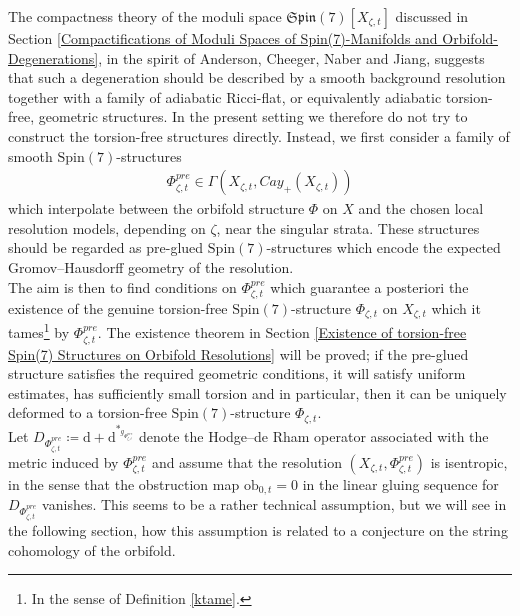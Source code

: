\documentclass[psamsfonts]{amsart}
\theoremstyle{plain}
\theoremstyle{definition}{
\newtheorem{defi}{Definition}[section]
\newtheorem{ass}{Assumption}
\newtheorem*{nota}{Notation}}
\theoremstyle{remark}{
\newtheorem{rem}{Remark}
\newtheorem{ex}{Example}}
\theoremstyle{plain}{
\newtheorem{thm}{Theorem}[section]
\newtheorem{lem}{Lemma}[section]
\newtheorem{cor}{Corollary}[section]
\newtheorem{prop}{Proposition}[section]
\newtheorem{con}{Conjecture}[section]}
\newcommand{\m}[1]{{\mathrm{#1}}}
\begin{document}
The compactness theory of the moduli space $\mathfrak{Spin}(7)[X_{\zeta,t}]$ discussed in Section \ref{Compactifications of Moduli Spaces of Spin(7)-Manifolds and Orbifold-Degenerations}, in the spirit of Anderson, Cheeger, Naber and Jiang\cite{anderson1990convergence,cheeger1986collapsing,cheeger1990collapsing,cheegernaber2015regularity,jiang2020l2curvatureboundsmanifolds}, suggests that such a degeneration should be described by a smooth background resolution together with a family of adiabatic Ricci-flat, or equivalently adiabatic torsion-free, geometric structures. In the present setting we therefore do not try to construct the torsion-free structures directly. Instead, we first consider a family of smooth $\m{Spin}(7)$-structures
\begin{align*}
        \Phi^{pre}_{\zeta,t}\in \Gamma(X_{\zeta,t},Cay_+(X_{\zeta,t}))
\end{align*}
which interpolate between the orbifold structure $\Phi$ on $X$ and the chosen local resolution models, depending on $\zeta$, near the singular strata. These structures should be regarded as pre-glued $\m{Spin}(7)$-structures which encode the expected Gromov--Hausdorff geometry of the resolution.\\

The aim is then to find conditions on $\Phi^{pre}_{\zeta,t}$ which guarantee a posteriori the existence of the genuine torsion-free $\m{Spin}(7)$-structure $\Phi_{\zeta,t}$ on $X_{\zeta,t}$ which it tames\footnote{In the sense of Definition \ref{ktame}.} by $\Phi^{pre}_{\zeta,t}$. The existence theorem in Section \ref{Existence of torsion-free Spin(7) Structures on Orbifold Resolutions}
will be proved; if the pre-glued structure satisfies the required geometric conditions, it will satisfy uniform estimates, has sufficiently small torsion and in particular, then it can be uniquely deformed to a torsion-free $\m{Spin}(7)$-structure $\Phi_{\zeta,t}$.\\

Let $D_{\Phi^{pre}_{\zeta,t}}\coloneqq\m{d}+\m{d}^{*_{g_{\Phi^{pre}_{\zeta,t}}}}$ denote the Hodge--de Rham operator associated with the metric induced by $\Phi^{pre}_{\zeta,t}$ and assume that the resolution $(X_{\zeta,t},\Phi^{pre}_{\zeta,t})$ is isentropic, in the sense that the obstruction map $\m{ob}_{0,t}=0$ in the linear gluing sequence for $D_{\Phi^{pre}_{\zeta,t}}$ vanishes. This seems to be a rather technical assumption, but we will see in the following section, how this assumption is related to a conjecture on the string cohomology of the orbifold.\\ 
\end{document}
